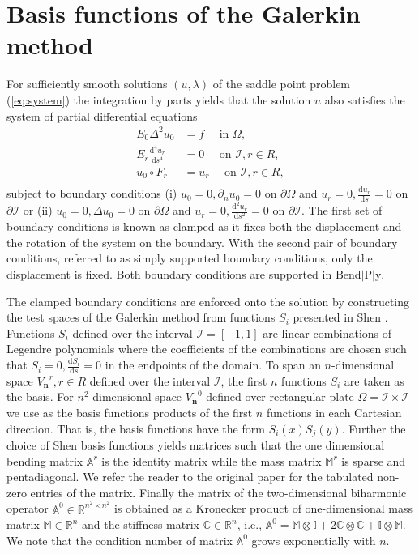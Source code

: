 \documentclass{marine_2015}
\newcommand{\Vh}{\ensuremath{V_{\mathbf{n}}}}
\newcommand{\deriv}[2]{\ensuremath{\frac{\mathrm{d}#1}{\mathrm{d}#2}}}
\newcommand{\tderiv}[2]{\ensuremath{\tfrac{\mathrm{d}#1}{\mathrm{d}#2}}}
\begin{document}
\section{Basis functions of the Galerkin method}
\label{sec:basis}
For sufficiently smooth solutions $\left(u, \lambda\right)$ of the saddle point
problem (\ref{eq:system}) the integration by parts yields that the solution $u$ also
satisfies the system of partial differential equations
\[
  \begin{aligned}
    E_0\Delta^2u_0 &= f\quad\text{ in }\Omega,\\
    E_r\deriv{^4 u_r}{s^4} &= 0\quad\text{ on }\mathcal{I}, r\in R,\\
    u_0 \circ F_r&= u_r\quad\text{ on }\mathcal{I}, r\in R,\\
  \end{aligned}
\]
subject to boundary conditions (i) $u_0=0, \partial_n u_0=0$ on $\partial\Omega $ and 
$u_r=0, \tderiv{u_r}{s}=0$ on $\partial\mathcal{I}$
or (ii) $u_0=0, \Delta u_0=0$ on $\partial\Omega$ and $u_r=0, \tderiv{^2u_r}{s^2}=0$ on
$\partial\mathcal{I}$. The first set of boundary conditions is known as clamped as
it fixes both the displacement and the rotation of the system on the boundary.
With the second pair of boundary conditions, referred to as simply supported boundary 
conditions, only the displacement is fixed. Both boundary conditions are supported 
in $\text{Bend}\!\left|\text{P}\right|\!\text{y}$. 

The clamped boundary conditions are enforced onto the solution by constructing
the test spaces of the Galerkin method from functions $S_i$ presented in Shen
\cite{shenpaper}. Functions $S_i$ defined over the interval
$\mathcal{I}=\left[-1, 1\right]$ are linear combinations of Legendre
polynomials where the coefficients of the combinations are chosen such that
$S_i=0, \tderiv{S_i}{s}=0$ in the endpoints of the domain. To span an $n$-dimensional 
space $\Vh^r, r\in R$ defined over the interval $\mathcal{I}$, the first 
$n$ functions $S_i$ are taken as the basis. For $n^2$-dimensional space $\Vh^0$ 
defined over rectangular plate $\Omega=\mathcal{I}\times\mathcal{I}$ we use as the 
basis functions products of the first $n$ functions in each Cartesian
direction. That is, the basis functions have the form $S_i\left(x\right)S_j\left(y\right)$. 
Further the choice of Shen basis functions yields matrices such that the one 
dimensional bending matrix $\mathbb{A}^r$ is the identity matrix while the mass 
matrix $\mathbb{M}^r$ is sparse and pentadiagonal. We refer the reader to the original paper \cite{shenpaper} 
for the tabulated non-zero entries of the matrix. Finally the matrix of the two-dimensional 
biharmonic operator $\mathbb{A}^0\in\mathbb{R}^{n^2\times n^2}$ is obtained
as a Kronecker product of one-dimensional mass matrix $\mathbb{M}\in\mathbb{R}^n$ and 
the stiffness matrix $\mathbb{C}\in\mathbb{R}^n$, i.e., $\mathbb{A}^0 = \mathbb{M}\otimes\mathbb{I} + 
2\mathbb{C}\otimes\mathbb{C} + \mathbb{I}\otimes\mathbb{M}$. We note that the
condition number of matrix $\mathbb{A}^0$ grows exponentially with $n$.
\end{document}
